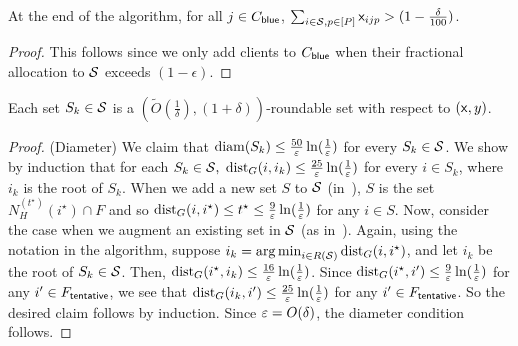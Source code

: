 \begin{claim}
		At the end of the algorithm, for all $j \in C_{\mathsf{blue}}$, $\sum_{i \in {\cal S}, p \in [P]} {\mathsf x}_{ijp} > (1-\frac{\delta}{100})$.	
\end{claim}
\begin{proof}
This follows since we only add clients to $C_{\mathsf{blue}}$ when their fractional allocation to ${\cal S}$ exceeds $(1-\epsilon)$.
\end{proof}



\begin{lemma}
\label{lem:sk}
Each set $S_k \in {\cal S}$ is a $\left(\tilde{O}\left(\frac{1}{\delta}\right),(1+\delta)\right)$-roundable set with respect to $({\mathsf x},y)$.
\end{lemma}
\begin{proof}
(Diameter) We claim that $\mathrm{diam}(S_k) \leq \frac{50}{\varepsilon}\ln(\frac{1}{\varepsilon})$ for every $S_k \in {\cal S}$. We show by induction that for each $S_k \in {\cal S},$
$\mathrm{dist}_G(i,i_k) \leq \frac{25}{\varepsilon}\ln(\frac{1}{\varepsilon})$ for every $i \in S_k$, where $i_k$ is the root of $S_k$. When we add a new set $S$ to ${\cal S}$ (in~),
$S$ is the set $N^{(t^\star)}_H(i^\star)\cap F$ and so $\mathrm{dist}_G(i,i^\star) \leq t^\star \leq \frac{9}{\varepsilon}\ln(\frac{1}{\varepsilon})$ %
for any $i \in S$. Now, consider the case when we augment an existing set  in $\cal S$ (as in~).
Again, using the notation in the algorithm, suppose $i_k = \operatorname*{arg\,min}_{i \in R({\cal S})} \mathrm{dist}_G(i, i^\star)$, and let $i_k$ be the
root of $S_k \in {\cal S}$. Then, $\mathrm{dist}_G(i^\star, i_k) \leq \frac{16}{\varepsilon}\ln(\frac{1}{\varepsilon})$. Since $\mathrm{dist}_G(i^\star, i') \leq \frac{9}{\varepsilon}\ln(\frac{1}{\varepsilon})$ for any $i' \in F_\mathsf{tentative}$, we see that
$\mathrm{dist}_G(i_k, i') \leq \frac{25}{\varepsilon}\ln(\frac{1}{\varepsilon})$ for any $i' \in F_\mathsf{tentative}$.
So the desired claim follows by induction. Since $\varepsilon = O(\delta)$, the diameter condition follows.
\smallskip


\end{proof}
